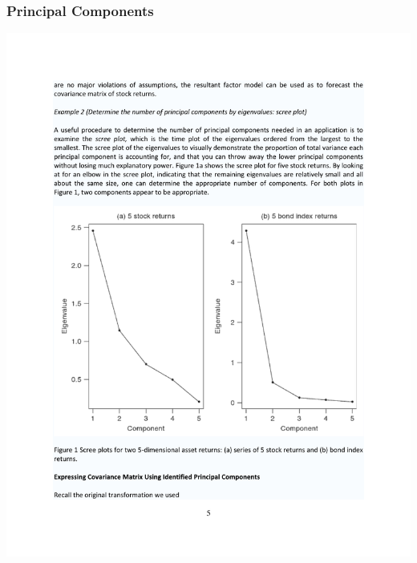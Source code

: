 \begin{frame}
\frametitle{Principal Components}
\begin{center}
\includegraphics[height=0.85\textheight]{./resources/princomp1}
\end{center}
\end{frame}

